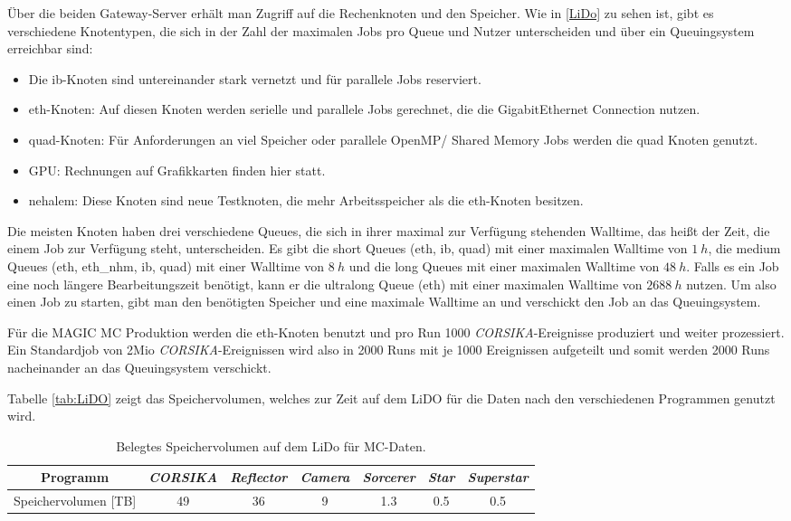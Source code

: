 Über die beiden Gateway-Server erhält man Zugriff auf die Rechenknoten und den Speicher.
Wie in \autoref{LiDo} zu sehen ist, gibt es verschiedene Knotentypen, die sich in der Zahl der maximalen Jobs pro Queue und Nutzer unterscheiden und über ein Queuingsystem erreichbar sind:

\begin{itemize}
 \item Die ib-Knoten sind untereinander stark vernetzt und für parallele Jobs reserviert.
 \item eth-Knoten: Auf diesen Knoten werden serielle und parallele Jobs gerechnet, die die GigabitEthernet Connection nutzen.
 \item quad-Knoten: Für Anforderungen an viel Speicher oder parallele OpenMP/ Shared Memory Jobs werden die quad Knoten genutzt.
 \item GPU: Rechnungen auf Grafikkarten finden hier statt.
 \item nehalem: Diese Knoten sind neue Testknoten, die mehr Arbeitsspeicher als die eth-Knoten besitzen.
\end{itemize}

Die meisten Knoten haben drei verschiedene Queues, die sich in ihrer maximal zur Verfügung stehenden Walltime, das heißt der Zeit, die einem Job zur Verfügung steht, unterscheiden.
Es gibt die short Queues (eth, ib, quad) mit einer maximalen Walltime von $\SI{1}{h}$, die medium Queues (eth, eth\_nhm, ib, quad) mit einer Walltime von $\SI{8}{h}$ und die long Queues mit einer maximalen Walltime von $\SI{48}{h}$. 
Falls es ein Job eine noch längere Bearbeitungszeit benötigt, kann er die ultralong Queue (eth) mit einer maximalen Walltime von $\SI{2688}{h}$ nutzen.
Um also einen Job zu starten, gibt man den benötigten Speicher und eine maximale Walltime an und verschickt den Job an das Queuingsystem.

Für die MAGIC MC Produktion werden die eth-Knoten benutzt und pro Run 1000 \textit{CORSIKA}-Ereignisse produziert und weiter prozessiert. 
Ein Standardjob von 2Mio \textit{CORSIKA}-Ereignissen wird also in 2000 Runs mit je 1000 Ereignissen aufgeteilt und somit werden 2000 Runs nacheinander an das Queuingsystem verschickt.


Tabelle \autoref{tab:LiDO} zeigt das Speichervolumen, welches zur Zeit auf dem LiDO für die Daten nach den verschiedenen Programmen genutzt wird.

\begin{table}[h!]
    \centering
    \caption{Belegtes Speichervolumen auf dem LiDo für MC-Daten.}
    \label{tab:LiDO}
    \begin{tabular}{ccccccc}
        \toprule
        Programm & \textit{CORSIKA} & \textit{Reflector} & \textit{Camera} & \textit{Sorcerer} & \textit{Star} & \textit{Superstar}\\
        \midrule
        Speichervolumen [TB] & 49 & 36 & 9 & 1.3 & 0.5 & 0.5\\
        \bottomrule
    \end{tabular}
\end{table}


